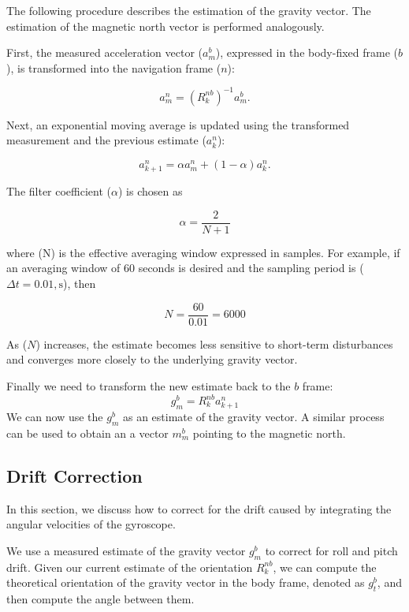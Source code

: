 \documentclass{article}
\begin{document}
\vspace{1em}
\noindent The following procedure describes the estimation of the gravity vector. The estimation of the magnetic north vector is performed analogously.

\vspace{1em}
\noindent First, the measured acceleration vector ($a_m^b$), expressed in the body-fixed frame ($b$), is transformed into the navigation frame ($n$):

\[
a_m^n = \left(R_k^{nb}\right)^{-1} a_m^b.
\]

\vspace{1em}
\noindent Next, an exponential moving average is updated using the transformed measurement and the previous estimate ($a_k^n$):

\[
a_{k+1}^n = \alpha a_m^n + (1-\alpha)a_k^n.
\]

\vspace{1em}
\noindent The filter coefficient ($\alpha$) is chosen as

\[
\alpha = \frac{2}{N+1}
\]

\noindent where (N) is the effective averaging window expressed in samples.
For example, if an averaging window of 60 seconds is desired and the sampling period is ($\Delta t = 0.01,\mathrm{s}$), then

\[
N = \frac{60}{0.01} = 6000
\]

\noindent As ($N$) increases, the estimate becomes less sensitive to short-term disturbances and converges more closely to the underlying gravity vector.

\vspace{1em}
\noindent Finally we need to transform the new estimate back to the $b$ frame:
\[
g^b_m = R_k^{nb} a_{k+1}^n
\]
We can now use the $g^b_m$ as an estimate of the gravity vector.
A similar process can be used to obtain an a vector $m^b_m$ pointing to the magnetic north.


\subsection{Drift Correction}

\noindent In this section, we discuss how to correct for the drift caused by integrating the angular velocities of the gyroscope.

\vspace{1em}
\noindent We use a measured estimate of the gravity vector $g_m^b$ to correct for roll and pitch drift. Given our current estimate of the orientation $R^{nb}_k$, we can compute the theoretical orientation of the gravity vector in the body frame, denoted as $g_t^b$, and then compute the angle between them.
\end{document}
